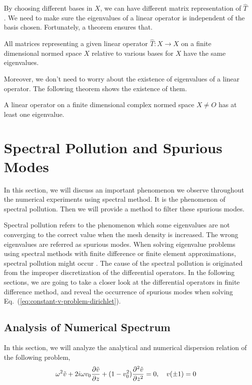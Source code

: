 By choosing different bases in $X$, we can have different matrix representation of $\hat{T}$. We need to make sure the eigenvalues of a linear operator is independent of the basis chosen. Fortunately, a theorem ensures that.

\begin{theorem} 
	All matrices representing a given linear operator $\hat{T}: X \to X$ on a finite dimensional normed space $X$ relative to various bases for $X$ have the same eigenvalues.
\end{theorem}


Moreover, we don't need to worry about the existence of eigenvalues of a linear operator. The following theorem shows the existence of them.
\begin{theorem} 
	A linear operator on a finite dimensional complex normed space $X\neq{O}$ has at least one eigenvalue.
\end{theorem}

\section{Spectral Pollution and Spurious Modes}
In this section, we will discuss an important phenomenon we observe throughout the numerical experiments using spectral method. It is the phenomenon of spectral pollution. Then we will provide a method to filter these spurious modes.

Spectral pollution refers to the phenomenon which some eigenvalues are not converging to the correct value when the mesh density is increased. The wrong eigenvalues are referred as spurious modes. When solving eigenvalue problems using spectral methods with finite difference or finite element approximations, spectral pollution might occur \cite{llobet_spectral_1990}. The cause of the spectral pollution is originated from the improper discretization of the differential operators. In the following sections, we are going to take a closer look at the differential operators in finite difference method, and reveal the occurrence of spurious modes when solving Eq.~(\ref{eq:constant-v-problem-dirichlet}).

\subsection{Analysis of Numerical Spectrum} \label{sec:analysis-of-numerical-spectrum}
In this section, we will analyze the analytical and numerical dispersion relation of the following problem,
\[
	\omega^2\tilde{v} + 2i\omega v_0\pdv{\tilde{v}}{z} + (1-v_0^2)\pdv[2]{\tilde{v}}{z} = 0, \quad v(\pm 1) = 0
\]

